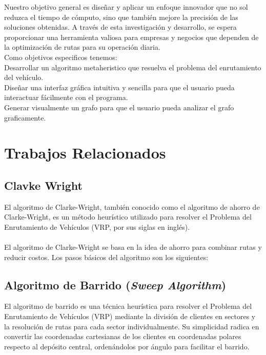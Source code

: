 \documentclass[10pt,twocolumn,letterpaper]{article}
\begin{document}
Nuestro objetivo general es diseñar y aplicar un enfoque innovador que no sol reduzca el tiempo de cómputo, sino que también mejore la precisión de las soluciones obtenidas. A través de esta investigación y desarrollo, se espera proporcionar una herramienta valiosa para empresas y negocios que dependen de la optimización de rutas para su operación diaria.\\

Como objetivos especificos tenemos:\\

	Desarrollar un algoritmo metaheristico que resuelva el problema del enrutamiento del vehículo.\\

	Diseñar una interfaz gráfica intuitiva y sencilla para que el usuario pueda interactuar fácilmente con el programa.\\

	Generar visualmente un grafo para que el usuario pueda analizar el grafo graficamente.

\section{Trabajos Relacionados}
\subsection{Clavke Wright}
El algoritmo de Clarke-Wright, también conocido como el algoritmo de ahorro de Clarke-Wright, es un método heurístico utilizado para resolver el Problema del Enrutamiento de Vehículos (VRP, por sus siglas en inglés).\\
\\
El algoritmo de Clarke-Wright se basa en la idea de ahorro para combinar rutas y reducir costos. Los pasos básicos del algoritmo son los siguientes:

\subsection{Algoritmo de Barrido (\textit{Sweep Algorithm})}
El algoritmo de barrido es una técnica heurística para resolver el Problema del Enrutamiento de Vehículos (VRP) mediante la división de clientes en sectores y la resolución de rutas para cada sector individualmente. Su simplicidad radica en convertir las coordenadas cartesianas de los clientes en coordenadas polares respecto al depósito central, ordenándolos por ángulo para facilitar el barrido.\\
\end{document}
